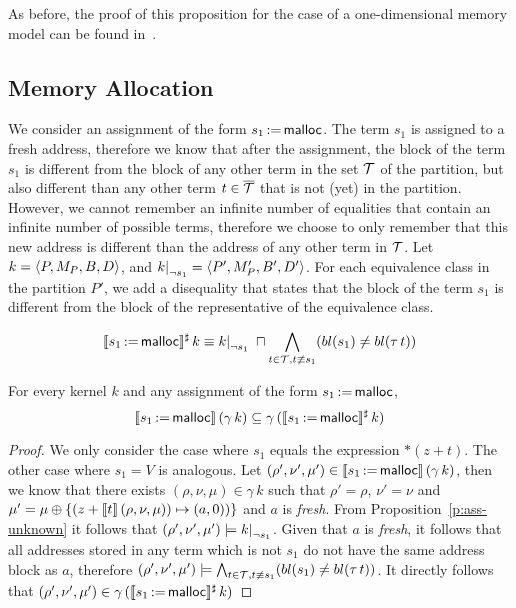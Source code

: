 As before, the proof of this proposition for the case of a one-dimensional memory model can be found in~\cite{2pointer}.

\subsection{Memory Allocation}

We consider an assignment of the form $s_1\,{:=}\,\textsf{malloc}$.
The term $s_1$ is assigned to a fresh address, therefore we know that after the assignment,
the block of the term $s_1$ is different from the block of any other term in the set $\mathcal{T}$ of the partition,
but also different than any other term $t \in {\overline{\mathcal{T}}}$ that is not (yet) in the partition.
However, we cannot remember an infinite number of equalities that contain an infinite number of possible terms,
therefore we choose to only remember that this new address is different than the address of any other term in $\mathcal{T}$.
Let $k = \langle P, M_P, B,D\rangle$, and $\restr{k}{\neg s_1} = \angl{P', M_P', B', D'}$.
For each equivalence class in the partition $P'$, we add a disequality that states
that the block of the term $s_1$ is different from the block of the representative of the equivalence class.

\[
	\sem{s_1\,{:=}\,\text{\malloc}}^\sharp\,k \equiv
	\restr{k}{\neg s_1}\;\meet
	\bigwedge_{t\in \T, t \nequiv s_1}(bl(s_1) \neq bl(\tau\,t))
\]

\begin{proposition}\label{p:ass-malloc}
	For every kernel $k$ and any assignment of the form $s_1\,{:=}\,\textsf{malloc}$,
	\[
		\llbracket s_1\,{:=}\,\textsf{malloc}\rrbracket\,(\gamma\,k) \subseteq \gamma\,(\llbracket s_1\,{:=}\,\textsf{malloc}\rrbracket^\sharp\,k)
	\]
\end{proposition}

\begin{proof}
	We only consider the case where $s_1$ equals the expression $*(z+t)$.
	The other case where $s_1 = V$ is analogous.
	Let $(\rho',\nu',\mu') \in \llbracket s_1\,{:=}\,\textsf{malloc}\rrbracket\,(\gamma\,k)$, then we know that there exists $(\rho,\nu,\mu) \in \gamma\,k$ such that $\rho'=\rho$, $\nu'=\nu$ and $\mu' =\mu\oplus\{(z+\llbracket t\rrbracket\,(\rho,\nu,\mu))\mapsto (a,0))\}$ and $a$ is \emph{fresh}.
	From Proposition~\ref{p:ass-unknown} it follows that $(\rho',\nu',\mu') \models \restr{k}{\neg s_1}$.
	Given that $a$ is \emph{fresh}, it follows that all addresses stored in any term which is not $s_1$ do not have the same address block as $a$, therefore $(\rho',\nu',\mu') \models \bigwedge_{t\in \mathcal{T}, t \not\equiv s_1}(bl(s_1) \neq bl(\tau\,t))$.
	It directly follows that $(\rho',\nu',\mu') \in \gamma\,(\llbracket s_1\,{:=}\,\textsf{malloc}\rrbracket^\sharp\,k)$
\end{proof}
